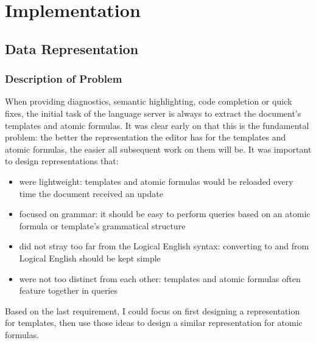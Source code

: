 \documentclass[../main.tex]{subfiles}
\begin{document}
\chapter{Implementation}
\section{Data Representation}
\subsection{Description of Problem}
When providing diagnostics, semantic highlighting, code completion or quick fixes, the initial task of the language server is always to extract the document's templates and atomic formulas. It was clear early on that this is the fundamental problem: the better the representation the editor has for the templates and atomic formulas, the easier all subsequent work on them will be. It was important to design representations that:
\begin{itemize}
    \item were lightweight: templates and atomic formulas would be reloaded every time the document received an update
    \item focused on grammar: it should be easy to perform queries based on an atomic formula or template's grammatical structure
    \item did not stray too far from the Logical English syntax: converting to and from Logical English should be kept simple
    \item were not too distinct from each other: templates and atomic formulas often feature together in queries
\end{itemize}
Based on the last requirement, I could focus on first designing a representation for templates, then use those ideas to design a similar representation for atomic formulas. 
\end{document}
